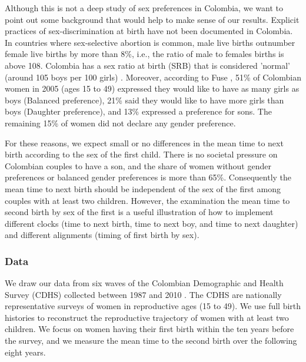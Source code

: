 \documentclass[a4paper,left=1.25cm,right=1.25cm,top=1.25cm,bottom=1.25cm]{article}
\begin{document}
  Although this is not a deep study of sex preferences in Colombia, we want to point out some background that would help to make sense of our results. Explicit practices of sex-discrimination at birth have not been documented in Colombia. In countries where sex-selective abortion is common, male live births outnumber female live births by more than 8\%, i.e., the ratio of male to females births is above 108. Colombia has a sex ratio at birth (SRB) that is considered 'normal' (around 105 boys per 100 girls) \cite{bongaarts2013}. Moreover, according to Fuse \citeyear{fuse2010}, 51\% of Colombian women in 2005 (ages 15 to 49) expressed they would like to have as many girls as boys (Balanced preference), 21\% said they would like to have more girls than boys (Daughter preference), and 13\% expressed a preference for sons. The remaining 15\% of women did not declare any gender preference. 
 
  For these reasons, we expect small or no differences in the mean time to next birth according to the sex of the first child. There is no societal pressure on Colombian couples to have a son, and the share of women without gender preferences or balanced gender preferences is more than 65\%. Consequently the mean time to next birth should be independent of the sex of the first among couples with at least two children. However, the examination the mean time to second birth by sex of the first is a useful illustration of how to implement different clocks (time to next birth, time to next boy, and time to next daughter) and different alignments (timing of first birth by sex).
 
 
\subsubsection{Data}

We draw our data from six waves of the Colombian Demographic and Health Survey (CDHS) collected between 1987 and 2010 \citep{DHS}. The CDHS are nationally representative surveys of women in reproductive ages (15 to 49). We use full birth histories to reconstruct the reproductive trajectory of women with at least two children. We focus on women having their first birth within the ten years before the survey, and we measure the mean time to the second birth over the following eight years.
\end{document}
